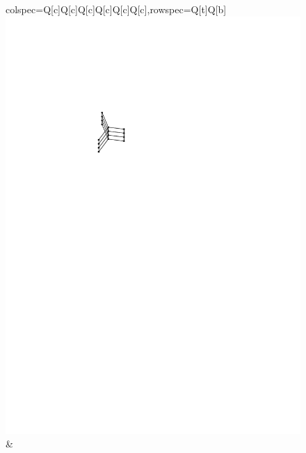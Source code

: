 \documentclass{patmorin}
\theoremstyle{plain}
\theoremstyle{definition}
\begin{document}
\begin{figure}[ht]
\begin{tblr}{colspec={Q[c]Q[c]Q[c]Q[c]Q[c]Q[c]},rowspec={Q[t]Q[b]}}
 \includegraphics[page=1]{figs/S_3xP_4} &

\end{tblr}
\end{figure}
\end{document}
